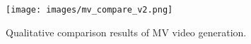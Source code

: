 \begin{figure}[t]
\centering
    \texttt{[image: images/mv\_compare\_v2.png]}
\caption{Qualitative comparison results of MV video generation.}
\vspace{-5mm}
\label{fig:results_mv}
\end{figure}